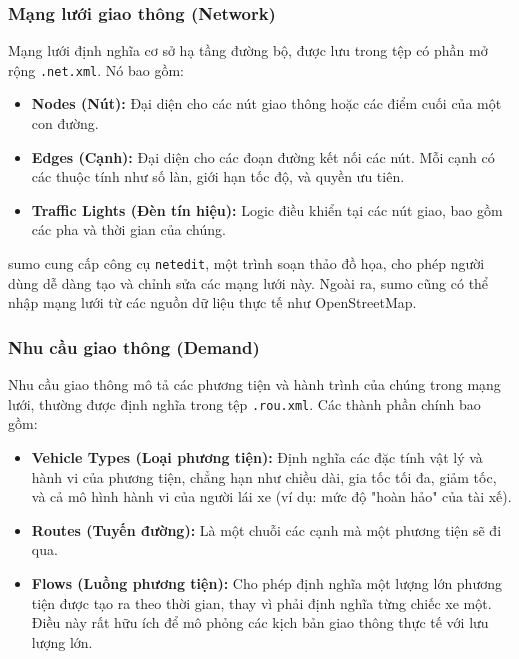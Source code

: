 \subsubsection{Mạng lưới giao thông (Network)}
Mạng lưới định nghĩa cơ sở hạ tầng đường bộ, được lưu trong tệp có phần mở rộng
\texttt{.net.xml}. Nó bao gồm:
\begin{itemize}
    \item \textbf{Nodes (Nút):} Đại diện cho các nút giao thông hoặc các điểm
        cuối của một con đường.

    \item \textbf{Edges (Cạnh):} Đại diện cho các đoạn đường kết nối các nút. Mỗi
        cạnh có các thuộc tính như số làn, giới hạn tốc độ, và quyền ưu tiên.

    \item \textbf{Traffic Lights (Đèn tín hiệu):} Logic điều khiển tại các nút
        giao, bao gồm các pha và thời gian của chúng.
\end{itemize}
\ac{sumo} cung cấp công cụ \texttt{netedit}, một trình soạn thảo đồ họa, cho phép
người dùng dễ dàng tạo và chỉnh sửa các mạng lưới này. Ngoài ra, \ac{sumo} cũng
có thể nhập mạng lưới từ các nguồn dữ liệu thực tế như OpenStreetMap.

\subsubsection{Nhu cầu giao thông (Demand)}
Nhu cầu giao thông mô tả các phương tiện và hành trình của chúng trong mạng lưới,
thường được định nghĩa trong tệp \texttt{.rou.xml}. Các thành phần chính bao gồm:
\begin{itemize}
    \item \textbf{Vehicle Types (Loại phương tiện):} Định nghĩa các đặc tính vật
        lý và hành vi của phương tiện, chẳng hạn như chiều dài, gia tốc tối đa, giảm
        tốc, và cả mô hình hành vi của người lái xe (ví dụ: mức độ "hoàn hảo"
        của tài xế).

    \item \textbf{Routes (Tuyến đường):} Là một chuỗi các cạnh mà một phương
        tiện sẽ đi qua.

    \item \textbf{Flows (Luồng phương tiện):} Cho phép định nghĩa một lượng lớn
        phương tiện được tạo ra theo thời gian, thay vì phải định nghĩa từng chiếc
        xe một. Điều này rất hữu ích để mô phỏng các kịch bản giao thông thực tế
        với lưu lượng lớn.
\end{itemize}

